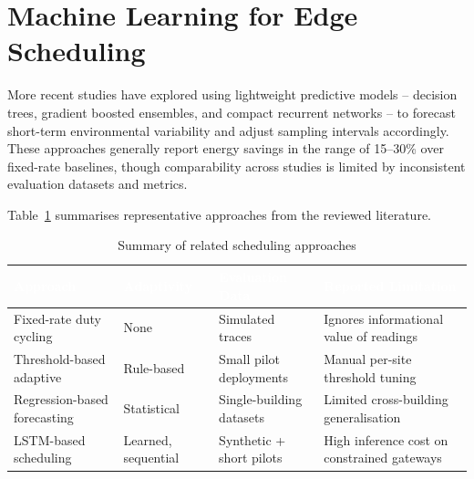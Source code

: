 \section{Machine Learning for Edge Scheduling}

More recent studies have explored using lightweight predictive models -- decision trees, gradient
boosted ensembles, and compact recurrent networks -- to forecast short-term environmental
variability and adjust sampling intervals accordingly. These approaches generally report energy
savings in the range of 15--30\% over fixed-rate baselines, though comparability across studies is
limited by inconsistent evaluation datasets and metrics.

Table~\ref{tab:related-work} summarises representative approaches from the reviewed literature.

\begin{table}[htbp]
\centering
\caption{Summary of related scheduling approaches}
\label{tab:related-work}
\begin{tabularx}{\textwidth}{@{}p{2.6cm}p{3.0cm}p{3.6cm}X@{}}
\toprule
\rowcolor{ummaroon!85}
\textcolor{white}{\textbf{Approach}} & \textcolor{white}{\textbf{Adaptivity}} &
\textcolor{white}{\textbf{Evaluation Data}} & \textcolor{white}{\textbf{Reported Limitation}} \\
\midrule
Fixed-rate duty cycling & None & Simulated traces & Ignores informational value of readings \\
\addlinespace
Threshold-based adaptive & Rule-based & Small pilot deployments & Manual per-site threshold tuning \\
\addlinespace
Regression-based forecasting & Statistical & Single-building datasets & Limited cross-building generalisation \\
\addlinespace
LSTM-based scheduling & Learned, sequential & Synthetic + short pilots & High inference cost on constrained gateways \\
\bottomrule
\end{tabularx}
\end{table}
